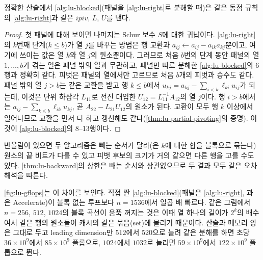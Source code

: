 \begin{proposition}
\label{prop:lu-blocked-same}
정확한 산술에서 \cref{alg:lu-blocked}(패널을 \cref{alg:lu-right}로 분해할 때)은 같은 동점 규칙의 \cref{alg:lu-right}과 같은 $\mathit{ipiv}$, $L$, $U$를 낸다.
\end{proposition}

\begin{proof}
첫 패널에 대해 보이면 나머지는 Schur 보수 $S$에 대한 귀납이다. \cref{alg:lu-right}의 $k$번째 단계($k\le b$)가 열 $j$를 바꾸는 방법은 행 교환과 $a_{ij}\gets a_{ij}-a_{ik}a_{kj}$뿐이고, 여기에 쓰이는 값은 열 $k$와 열 $j$의 원소뿐이다. 그러므로 처음 $b$번의 단계 동안 패널의 열 $1,\dots,b$가 겪는 일은 패널 밖의 열과 무관하고, 패널만 따로 분해한 \cref{alg:lu-blocked}의 6행과 정확히 같다. 피벗은 패널의 열에서만 고르므로 처음 $b$개의 피벗과 승수도 같다. 패널 밖의 열 $j>b$는 같은 교환을 받고 행 $k\le b$에서 $u_{kj}=a_{kj}-\sum_{i<k}\ell_{ki}u_{ij}$가 되는데, 이것은 단위 하삼각 $L_{11}$로 전진 대입한 $U_{12}=L_{11}^{-1}A_{12}$의 열 $j$이다. 행 $i>b$에서는 $a_{ij}-\sum_{k\le b}\ell_{ik}u_{kj}$, 곧 $A_{22}-L_{21}U_{12}$의 원소가 된다. 교환이 모두 행 $k$ 이상에서 일어나므로 교환을 먼저 다 하고 갱신해도 같다(\cref{thm:lu-partial-pivoting}의 증명). 이것이 \cref{alg:lu-blocked}의 8--13행이다.
\end{proof}

반올림이 있으면 두 알고리즘은 빼는 순서가 달라(은 $k$에 대한 합을 블록으로 묶는다) 원소의 끝 비트가 다를 수 있고 피벗 후보의 크기가 거의 같으면 다른 행을 고를 수도 있다. \cref{thm:lu-backward}의 상한은 빼는 순서와 상관없으므로 두 결과 모두 같은 오차 해석을 따른다.

\cref{fig:lu-gflops}는 이 차이를 보인다. 직접 짠 \cref{alg:lu-blocked}(패널은 \cref{alg:lu-right}, 과 은 Accelerate)이 블록 없는 루프보다 $n=1536$에서 일곱 배 빠르다. 같은 그림에서 $n=256$, $512$, $1024$의 블록 곡선이 움푹 꺼지는 것은 이때 열 하나의 길이가 $2^{k}$의 배수여서 같은 행의 원소들이 캐시의 같은 묶음(set)에 몰리기 때문이다. 산술과 메모리 양은 그대로 두고 leading dimension만 $512$에서 $520$으로 늘려 같은 분해를 하면 초당 $36\times10^9$에서 $85\times10^9$ 플롭으로, $1024$에서 $1032$로 늘리면 $59\times10^9$에서 $122\times10^9$ 플롭으로 뛴다.

